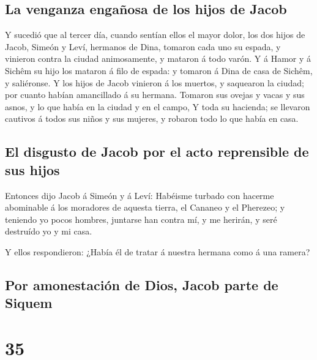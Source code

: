 \hypertarget{la-venganza-engauxf1osa-de-los-hijos-de-jacob}{%
\subsection{La venganza engañosa de los hijos de
Jacob}\label{la-venganza-engauxf1osa-de-los-hijos-de-jacob}}

 Y sucedió que al tercer día, cuando sentían ellos el
mayor dolor, los dos hijos de Jacob, Simeón y Leví, hermanos de Dina,
tomaron cada uno su espada, y vinieron contra la ciudad animosamente, y
mataron á todo varón.  Y á Hamor y á Sichêm su hijo los
mataron á filo de espada: y tomaron á Dina de casa de Sichêm, y
saliéronse.  Y los hijos de Jacob vinieron á los muertos,
y saquearon la ciudad; por cuanto habían amancillado á su hermana.
 Tomaron sus ovejas y vacas y sus asnos, y lo que había
en la ciudad y en el campo,  Y toda su hacienda; se
llevaron cautivos á todos sus niños y sus mujeres, y robaron todo lo que
había en casa.

\hypertarget{el-disgusto-de-jacob-por-el-acto-reprensible-de-sus-hijos}{%
\subsection{El disgusto de Jacob por el acto reprensible de sus
hijos}\label{el-disgusto-de-jacob-por-el-acto-reprensible-de-sus-hijos}}

 Entonces dijo Jacob á Simeón y á Leví: Habéisme turbado
con hacerme abominable á los moradores de aquesta tierra, el Cananeo y
el Pherezeo; y teniendo yo pocos hombres, juntarse han contra mí, y me
herirán, y seré destruído yo y mi casa.

 Y ellos respondieron: ¿Había él de tratar á nuestra
hermana como á una ramera?

\hypertarget{por-amonestaciuxf3n-de-dios-jacob-parte-de-siquem}{%
\subsection{Por amonestación de Dios, Jacob parte de
Siquem}\label{por-amonestaciuxf3n-de-dios-jacob-parte-de-siquem}}

\hypertarget{section-34}{%
\section{35}\label{section-34}}


